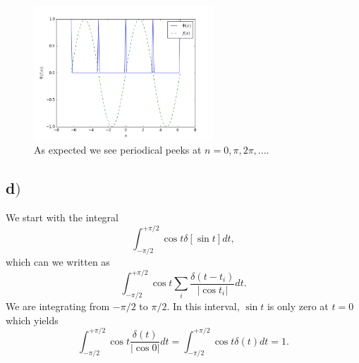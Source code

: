 \documentclass{article}
\begin{document}
\begin{figure}[H]
\centering
\includegraphics[width=0.6\textwidth]{matmet_figure_2}
\caption{As expected we see periodical peeks at $n = 0, \pi, 2\pi, ...$.}
\label{fig:figure_label}
\end{figure}

\subsection*{d$)$}
We start with the integral
\begin{equation}
\int_{-\pi/2}^{+\pi/2}\cos{t}\delta{[\sin{t}]}dt,
\end{equation}
which can we written as
\begin{equation}
\int_{-\pi/2}^{+\pi/2}\cos{t}\sum_{i} \frac{\delta(t-t_i)}{|\cos{t_i}|} dt.
\end{equation}
We are integrating from $-\pi/2$ to $\pi/2$. In this interval, $\sin{t}$ is only zero at $t=0$ which yields
\begin{equation}
\int_{-\pi/2}^{+\pi/2}\cos{t} \frac{\delta(t)}{|\cos{0}|} dt = \int_{-\pi/2}^{+\pi/2}\cos{t}\delta(t) dt = 1.
\end{equation}
\end{document}
